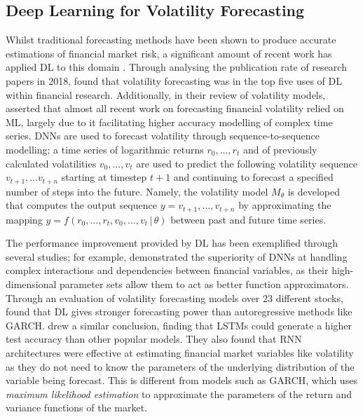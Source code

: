 \documentclass[a4paper, 11pt]{report}
\begin{document}
    \subsection{Deep Learning for Volatility Forecasting}

    Whilst traditional forecasting methods have been shown to produce accurate estimations of financial market risk, a significant amount of recent work has applied DL to this domain \citep{chartis-2019}. Through analysing the publication rate of research papers in 2018, \citet{sezer-2019} found that volatility forecasting was in the top five uses of DL within financial research. Additionally, in their review of volatility models, \citet{ge-2022} asserted that almost all recent work on forecasting financial volatility relied on ML, largely due to it facilitating higher accuracy modelling of complex time series. DNNs are used to forecast volatility through sequence-to-sequence modelling; a time series of logarithmic returns $r_0, \dots, r_t$ and of previously calculated volatilities $v_0, \dots, v_t$ are used to predict the following volatility sequence $v_{t+1}, \ldots v_{t+n}$ starting at timestep $t+1$ and continuing to forecast a specified number of steps into the future. Namely, the volatility model $M_{\theta}$ is developed that computes the output sequence $y = v_{t+1}, \dots, v_{t+n}$ by approximating the mapping $y = f( r_0, \dots, r_t, v_0, \dots, v_t \, \vert \, \theta )$ between past and future time series.
    
    The performance improvement provided by DL has been exemplified through several studies; for example, \citet{zhang-2022} demonstrated the superiority of DNNs at handling complex interactions and dependencies between financial variables, as their high-dimensional parameter sets allow them to act as better function approximators. Through an evaluation of volatility forecasting models over 23 different stocks, \citet{rahimikia-2020} found that DL gives stronger forecasting power than autoregressive methods like GARCH. \citet{rodikov-2022} drew a similar conclusion, finding that LSTMs could generate a higher test accuracy than other popular models. They also found that RNN architectures were effective at estimating financial market variables like volatility as they do not need to know the parameters of the underlying distribution of the variable being forecast. This is different from models such as GARCH, which uses \emph{maximum likelihood estimation} to approximate the parameters of the return and variance functions of the market.
\end{document}
